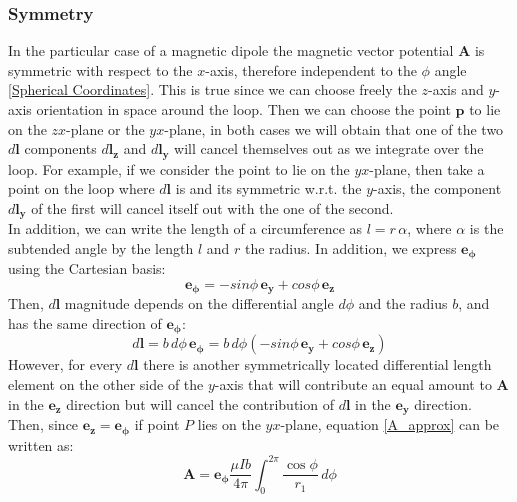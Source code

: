 \subsubsection{Symmetry}
In the particular case of a magnetic dipole the magnetic vector potential $\mathbf{A}$ is symmetric with respect to the \(x\)-axis, therefore independent to the $\phi$ angle \ref{Spherical Coordinates}.
This is true since we can choose freely the $z$-axis and $y$-axis orientation in space around the loop.
Then we can choose the point $\mathbf{p}$ to lie on the $zx$-plane or the $yx$-plane, in both cases we will obtain that one of the two $d\mathbf{l}$ components $d\mathbf{l_z}$ and $d\mathbf{l_y}$ will cancel themselves out as we integrate over the loop.
For example, if we consider the point to lie on the $yx$-plane, then take a point on the loop where $d\mathbf{l}$ is and its symmetric w.r.t. the $y$-axis, the component $d\mathbf{l_y}$ of the first will cancel itself out with the one of the second.
\\
In addition, we can write the length of a circumference as $l = r \, \alpha $, where $\alpha$ is the subtended angle by the length $l$ and $r$ the radius.
In addition, we express $\mathbf{e_\phi}$ using the Cartesian basis:
$$
\mathbf{e_\phi} = - sin\phi \, \mathbf{e_y} + cos\phi \, \mathbf{e_z}
$$
Then, $d\mathbf{l}$ magnitude depends on the differential angle $d\phi$ and the radius $b$, and has the same direction of $\mathbf{e_\phi}$:
\begin{equation}
    d\mathbf{l} = b \, d\phi \, \mathbf{e_\phi} = b \, d\phi\left(- sin\phi \, \mathbf{e_y} + cos\phi \, \mathbf{e_z}\right)
    \label{eq:dl}
\end{equation}
However, for every $d\mathbf{l}$ there is another symmetrically located differential length element on the other side of the $y$-axis that will contribute an equal amount to $\mathbf{A}$ in the $\mathbf{e_z}$ direction but will cancel the contribution of $d\mathbf{l}$ in the $\mathbf{e_y}$ direction. Then, since $\mathbf{e_z} = \mathbf{e_\phi}$ if point $P$ lies on the $yx$-plane, equation \ref{A_approx} can be written as:
\begin{equation}
\mathbf{A} = \mathbf{e_\phi} \frac{\mu I b}{4 \pi} \int_{0}^{2\pi}  \frac{\cos \phi}{r_1} \, d\phi
    \label{eq:A_final}
\end{equation}

\begin{comment}
Proof of symmetry 
https://www.youtube.com/watch?v=SJtbeg_PZ30&t=129s
\end{comment}

